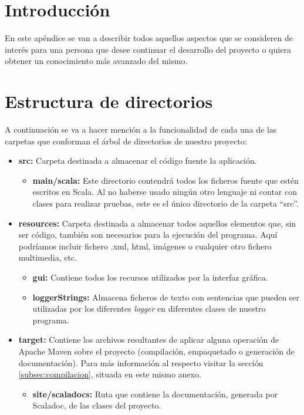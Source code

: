 

\section{Introducción}

En este apéndice se van a describir todos aquellos aspectos que se consideren de interés para una persona que desee continuar el desarrollo del proyecto o quiera obtener un conocimiento más avanzado del mismo.

\section{Estructura de directorios}

A continuación se va a hacer mención a la funcionalidad de cada una de las carpetas que conforman el árbol de directorios de nuestro proyecto:

\begin{itemize}
	\item \textbf{src:} Carpeta destinada a almacenar el código fuente la aplicación.
	\begin{itemize}
		\item \textbf{main/scala:} Este directorio contendrá todos los ficheros fuente que estén escritos en Scala. Al no haberse usado ningún otro lenguaje ni contar con clases para realizar pruebas, este es el único directorio de la carpeta ``src''.
	\end{itemize}
	\item \textbf{resources:} Carpeta destinada a almacenar todos aquellos elementos que, sin ser código, también son necesarios para la ejecución del programa. Aquí podríamos incluir fichero .xml, html, imágenes o cualquier otro fichero multimedia, etc.
	\begin{itemize}
		\item \textbf{gui:} Contiene todos los recursos utilizados por la interfaz gráfica.
		\item \textbf{loggerStrings:} Almacena ficheros de texto con sentencias que pueden ser utilizadas por los diferentes \textit{logger} en diferentes clases de nuestro programa.
	\end{itemize}
	\item \textbf{target:} Contiene los archivos resultantes de aplicar alguna operación de Apache Maven sobre el proyecto (compilación, empaquetado o generación de documentación). Para más información al respecto visitar la sección \ref{subsec:compilacion}, situada en este mismo anexo.
	\begin{itemize}
		\item \textbf{site/scaladocs:} Ruta que contiene la documentación, generada por Scaladoc, de las clases del proyecto.
	\end{itemize}
\end{itemize}


